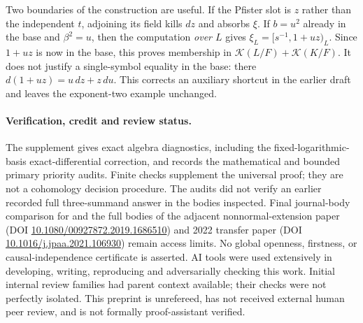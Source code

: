 \documentclass[11pt]{article}
\newcommand{\K}{\mathcal K}
\begin{document}
Two boundaries of the construction are useful.
If the Pfister slot is \(z\) rather than the independent \(t\),
adjoining its field kills \(dz\) and absorbs \(\xi\).
If \(b=u^2\) already in the base and \(\beta^2=u\), then the computation
\emph{over \(L\)} gives \(\xi_L=[s^{-1},1+uz)_L\).
Since \(1+uz\) is now in the base, this proves membership in
\(\K(L/F)+\K(K/F)\). It does not justify a single-symbol equality in
the base: there \(d(1+uz)=u\,dz+z\,du\).
This corrects an auxiliary shortcut in the earlier draft and leaves
the exponent-two example unchanged.

\paragraph{Verification, credit and review status.}
The supplement gives exact algebra diagnostics, including the
fixed-logarithmic-basis exact-differential correction, and records
the mathematical and bounded primary priority audits.
Finite checks supplement the universal proof; they are not a
cohomology decision procedure. The audits did not verify an earlier
recorded full three-summand answer in the bodies inspected.
Final journal-body comparison for \cite{ALO20} and the full bodies
of the adjacent nonnormal-extension paper
(DOI \href{https://doi.org/10.1080/00927872.2019.1686510}{10.1080/00927872.2019.1686510})
and 2022 transfer paper
(DOI \href{https://doi.org/10.1016/j.jpaa.2021.106930}{10.1016/j.jpaa.2021.106930})
remain access limits. No global openness, firstness, or causal-independence
certificate is asserted.
AI tools were used extensively in developing, writing, reproducing and
adversarially checking this work. Initial internal review families had
parent context available; their checks were not perfectly isolated.
This preprint is unrefereed, has not received external human peer review,
and is not formally proof-assistant verified.
\end{document}
